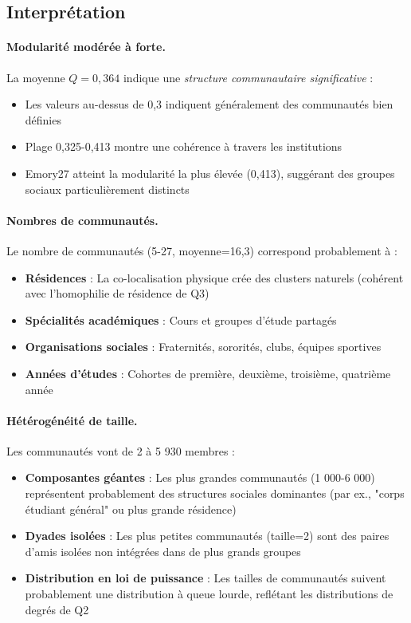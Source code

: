 \documentclass[12pt,a4paper]{article}
\begin{document}
\subsection{Interprétation}

\paragraph{Modularité modérée à forte.} La moyenne $Q=0,364$ indique une \textit{structure communautaire significative} :
\begin{itemize}
    \item Les valeurs au-dessus de 0,3 indiquent généralement des communautés bien définies
    \item Plage 0,325-0,413 montre une cohérence à travers les institutions
    \item Emory27 atteint la modularité la plus élevée (0,413), suggérant des groupes sociaux particulièrement distincts
\end{itemize}

\paragraph{Nombres de communautés.} Le nombre de communautés (5-27, moyenne=16,3) correspond probablement à :
\begin{itemize}
    \item \textbf{Résidences} : La co-localisation physique crée des clusters naturels (cohérent avec l'homophilie de résidence de Q3)
    \item \textbf{Spécialités académiques} : Cours et groupes d'étude partagés
    \item \textbf{Organisations sociales} : Fraternités, sororités, clubs, équipes sportives
    \item \textbf{Années d'études} : Cohortes de première, deuxième, troisième, quatrième année
\end{itemize}

\paragraph{Hétérogénéité de taille.} Les communautés vont de 2 à 5 930 membres :
\begin{itemize}
    \item \textbf{Composantes géantes} : Les plus grandes communautés (1 000-6 000) représentent probablement des structures sociales dominantes (par ex., "corps étudiant général" ou plus grande résidence)
    \item \textbf{Dyades isolées} : Les plus petites communautés (taille=2) sont des paires d'amis isolées non intégrées dans de plus grands groupes
    \item \textbf{Distribution en loi de puissance} : Les tailles de communautés suivent probablement une distribution à queue lourde, reflétant les distributions de degrés de Q2
\end{itemize}
\end{document}

